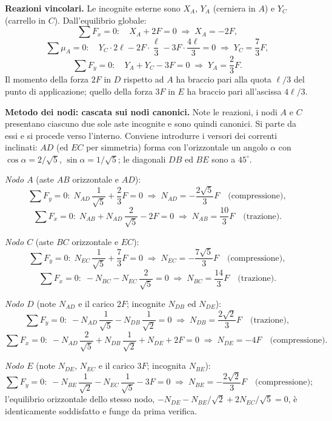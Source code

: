 \begin{esercizio}
\begin{svolgimento}
		\noindent\textbf{Reazioni vincolari.}
		Le incognite esterne sono $X_A$, $Y_A$ (cerniera in
		$A$) e $Y_C$ (carrello in $C$). Dall'equilibrio
		globale:
		\[
		\sum F_x = 0:\quad
		X_A + 2F = 0
		\;\Rightarrow\;
		X_A = -2F,
		\]
		\[
		\sum \mu_A = 0:\quad
		Y_C\cdot 2\ell - 2F\cdot\frac{\ell}{3}
		- 3F\cdot\frac{4\ell}{3} = 0
		\;\Rightarrow\;
		Y_C = \frac{7}{3}F,
		\]
		\[
		\sum F_y = 0:\quad
		Y_A + Y_C - 3F = 0
		\;\Rightarrow\;
		Y_A = \frac{2}{3}F.
		\]
		Il momento della forza $2F$ in $D$ rispetto ad $A$
		ha braccio pari alla quota $\ell/3$ del punto di
		applicazione; quello della forza $3F$ in $E$ ha
		braccio pari all'ascissa $4\ell/3$.
		
		\noindent\textbf{Metodo dei nodi: cascata sui nodi
			canonici.}
		Note le reazioni, i nodi $A$ e $C$ presentano
		ciascuno due sole aste incognite e sono quindi
		canonici. Si parte da essi e si procede verso
		l'interno. Conviene introdurre i versori dei
		correnti inclinati: $AD$ (ed $EC$ per simmetria)
		forma con l'orizzontale un angolo $\alpha$ con
		$\cos\alpha = 2/\sqrt5$, $\sin\alpha = 1/\sqrt5$;
		le diagonali $DB$ ed $BE$ sono a $45^\circ$.
		
		\smallskip
		\textit{Nodo $A$} (aste $AB$ orizzontale e $AD$):
		\[
		\sum F_y = 0:\;
		N_{AD}\,\frac{1}{\sqrt5} + \frac{2}{3}F = 0
		\;\Rightarrow\;
		N_{AD} = -\frac{2\sqrt5}{3}F
		\quad\text{(compressione)},
		\]
		\[
		\sum F_x = 0:\;
		N_{AB} + N_{AD}\,\frac{2}{\sqrt5} - 2F = 0
		\;\Rightarrow\;
		N_{AB} = \frac{10}{3}F
		\quad\text{(trazione)}.
		\]
		
		\smallskip
		\textit{Nodo $C$} (aste $BC$ orizzontale e $EC$):
		\[
		\sum F_y = 0:\;
		N_{EC}\,\frac{1}{\sqrt5} + \frac{7}{3}F = 0
		\;\Rightarrow\;
		N_{EC} = -\frac{7\sqrt5}{3}F
		\quad\text{(compressione)},
		\]
		\[
		\sum F_x = 0:\;
		-N_{BC} - N_{EC}\,\frac{2}{\sqrt5} = 0
		\;\Rightarrow\;
		N_{BC} = \frac{14}{3}F
		\quad\text{(trazione)}.
		\]
		
		\smallskip
		\textit{Nodo $D$} (note $N_{AD}$ e il carico $2F$;
		incognite $N_{DB}$ ed $N_{DE}$):
		\[
		\sum F_y = 0:\;
		-N_{AD}\,\frac{1}{\sqrt5} - N_{DB}\,\frac{1}{\sqrt2} = 0
		\;\Rightarrow\;
		N_{DB} = \frac{2\sqrt2}{3}F
		\quad\text{(trazione)},
		\]
		\[
		\sum F_x = 0:\;
		-N_{AD}\,\frac{2}{\sqrt5} + N_{DB}\,\frac{1}{\sqrt2}
		+ N_{DE} + 2F = 0
		\;\Rightarrow\;
		N_{DE} = -4F
		\quad\text{(compressione)}.
		\]
		
		\smallskip
		\textit{Nodo $E$} (note $N_{DE}$, $N_{EC}$ e il
		carico $3F$; incognita $N_{BE}$):
		\[
		\sum F_y = 0:\;
		-N_{BE}\,\frac{1}{\sqrt2} - N_{EC}\,\frac{1}{\sqrt5}
		- 3F = 0
		\;\Rightarrow\;
		N_{BE} = -\frac{2\sqrt2}{3}F
		\quad\text{(compressione)};
		\]
		l'equilibrio orizzontale dello stesso nodo,
		$-N_{DE} - N_{BE}/\sqrt2 + 2N_{EC}/\sqrt5 = 0$, è
		identicamente soddisfatto e funge da prima verifica.
		

\end{svolgimento}
\end{esercizio}
